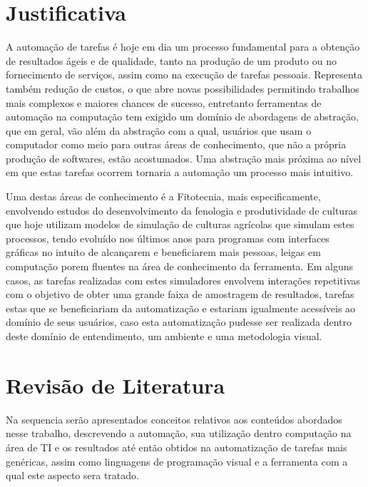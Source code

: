 \documentclass[12pt]{article}
\begin{document}
	\section{Justificativa}	
	
	A automação de tarefas é hoje em dia um processo fundamental para a obtenção de resultados ágeis e de qualidade, tanto na produção de um produto ou no fornecimento de serviços, assim como na execução de tarefas pessoais. Representa também redução de custos, o que abre novas possibilidades permitindo trabalhos mais complexos e maiores chances de sucesso, entretanto ferramentas de automação na computação tem exigido um domínio de abordagens de abstração, que em geral, vão além da abstração com a qual, usuários que usam o computador como meio para outras áreas de conhecimento, que não a própria produção de softwares, estão acostumados. Uma abstração mais próxima ao nível em que estas tarefas ocorrem tornaria a automação um processo mais intuitivo.
	
	Uma destas áreas de conhecimento é a Fitotecnia, mais especificamente, envolvendo estudos do desenvolvimento da fenologia e produtividade de culturas que hoje utilizam modelos de simulação de culturas agrícolas que simulam estes processos, tendo evoluído nos últimos anos para programas com interfaces gráficas no intuito de alcançarem e beneficiarem mais pessoas, leigas em computação porem fluentes na área de conhecimento da ferramenta. Em alguns casos, as tarefas realizadas com estes simuladores envolvem interações repetitivas com o objetivo de obter uma grande faixa de amostragem de resultados, tarefas estas que se beneficiariam da automatização e estariam igualmente acessíveis ao domínio de seus usuários, caso esta automatização pudesse ser realizada dentro deste domínio de entendimento, um ambiente e uma metodologia visual.  
	
	\section{Revisão de Literatura}
	Na sequencia serão apresentados conceitos relativos aos conteúdos abordados nesse trabalho, descrevendo a automação, sua utilização dentro computação na área de TI e os resultados até então obtidos na automatização de tarefas mais genéricas, assim como linguagens de programação visual e a ferramenta com a qual este aspecto sera tratado.
	
      
\end{document}
